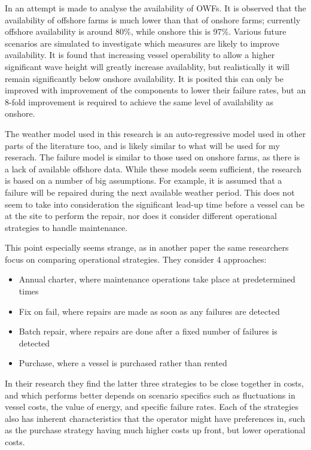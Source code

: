 \documentclass[a4paper,12pt]{article}
\begin{document}
\bigskip

In \cite{dinwoodie2012analysis} an attempt is made to analyse the availability of OWFs. It is observed that the availability of offshore farms is much lower than that of onshore farms; currently offshore availability is around 80\%, while onshore this is 97\%. Various future scenarios are simulated to investigate which measures are likely to improve availability. It is found that increasing vessel operability to allow a higher significant wave height will greatly increase availablity, but realistically it will remain significantly below onshore availability. It is posited this can only be improved with improvement of the components to lower their failure rates, but an 8-fold improvement is required to achieve the same level of availability as onshore. 

The weather model used in this research is an auto-regressive model used in other parts of the literature too, and is likely similar to what will be used for my reserach. The failure model is similar to those used on onshore farms, as there is a lack of available offshore data. While these models seem sufficient, the research is based on a number of big assumptions. For example, it is assumed that a failure will be repaired during the next available weather period. This does not seem to take into consideration the significant lead-up time before a vessel can be at the site to perform the repair, nor does it consider different operational strategies to handle maintenance. 

This point especially seems strange, as in another paper \cite{dinwoodie2014operational} the same researchers focus on comparing operational strategies. They consider 4 approaches: 

\begin{itemize}
\item Annual charter, where maintenance operations take place at predetermined times
\item Fix on fail, where repairs are made as soon as any failures are detected
\item Batch repair, where repairs are done after a fixed number of failures is detected
\item Purchase, where a vessel is purchased rather than rented
\end{itemize}

In their research they find the latter three strategies to be close together in costs, and which performs better depends on scenario specifics such as fluctuations in vessel costs, the value of energy, and specific failure rates. Each of the strategies also has inherent characteristics that the operator might have preferences in, such as the purchase strategy having much higher costs up front, but lower operational costs. 
\end{document}
